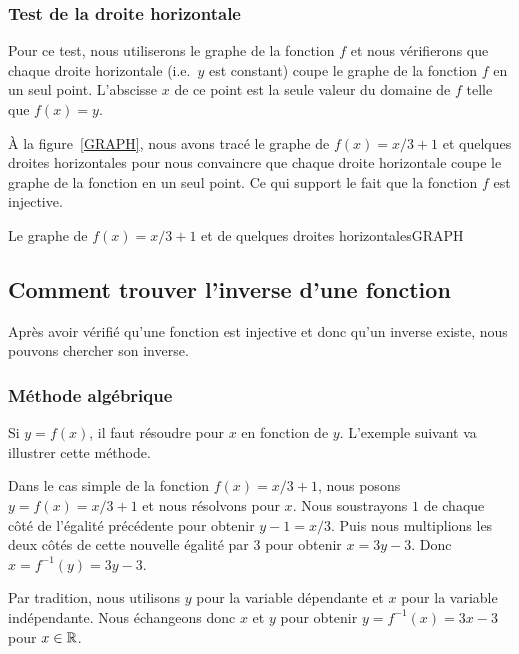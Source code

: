 {\subsubsection{Test de la droite horizontale}

Pour ce test, nous utiliserons le graphe de la fonction $f$ et nous
vérifierons que chaque droite horizontale (i.e.\ $y$ est constant) coupe
le graphe de la fonction $f$ en un seul point.  L'abscisse $x$ de ce
point est la seule valeur du domaine de $f$ telle que $f(x) = y$.

\begin{egg}
À la figure~\ref{GRAPH}, nous avons tracé le graphe de $f(x) = x/3 +1$ et
quelques droites horizontales pour nous convaincre que chaque droite
horizontale coupe le graphe de la fonction en un seul point.  Ce qui
support le fait que la fonction $f$ est injective.
\end{egg}

{Le graphe de $\displaystyle f(x) = x/3 +1$ et de quelques droites
horizontales}{GRAPH}

\subsection{Comment trouver l'inverse d'une fonction}

Après avoir vérifié qu'une fonction est injective et donc qu'un
inverse existe, nous pouvons chercher son inverse.

\subsubsection{Méthode algébrique}

Si $y=f(x)$, il faut résoudre pour $x$ en fonction de $y$.  L'exemple
suivant va illustrer cette méthode.

\begin{egg}
Dans le cas simple de la fonction $f(x) = x/3 +1$, nous posons
$y = f(x) = x/3 +1$ et nous résolvons pour $x$.  Nous soustrayons $1$
de chaque côté de l'égalité précédente pour obtenir $y - 1 =  x/3$.
Puis nous multiplions les deux côtés de cette nouvelle égalité par $3$
pour obtenir $x = 3y - 3$.  Donc $x=f^{-1}(y) = 3y-3$.

Par tradition, nous utilisons $y$ pour la variable dépendante et
$x$ pour la variable indépendante.  Nous échangeons donc $x$ et $y$ pour
obtenir $y = f^{-1}(x) = 3 x - 3$ pour $x\in \mathbb{R}$.
\end{egg}

}
